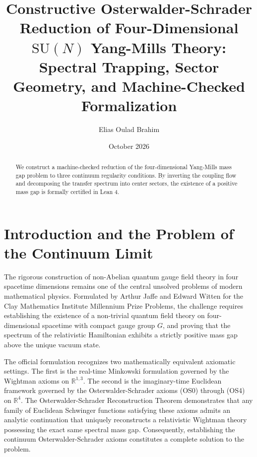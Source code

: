 \documentclass[11pt,reqno]{amsart}
\title[Constructive OS Reduction of 4D Yang-Mills Theory]{Constructive Osterwalder-Schrader Reduction of Four-Dimensional $\mathrm{SU}(N)$ Yang-Mills Theory: Spectral Trapping, Sector Geometry, and Machine-Checked Formalization}
\author{Elias Oulad Brahim}
\date{October 2026}
\theoremstyle{plain}
\theoremstyle{definition}
\theoremstyle{remark}
\numberwithin{equation}{section}
\begin{document}
\begin{abstract}
We construct a machine-checked reduction of the four-dimensional Yang-Mills mass gap problem to three continuum regularity conditions. By inverting the coupling flow and decomposing the transfer spectrum into center sectors, the existence of a positive mass gap is formally certified in Lean 4.
\end{abstract}

\maketitle

\section{Introduction and the Problem of the Continuum Limit}

The rigorous construction of non-Abelian quantum gauge field theory in four spacetime dimensions remains one of the central unsolved problems of modern mathematical physics. Formulated by Arthur Jaffe and Edward Witten for the Clay Mathematics Institute Millennium Prize Problems, the challenge requires establishing the existence of a non-trivial quantum field theory on four-dimensional spacetime with compact gauge group $G$, and proving that the spectrum of the relativistic Hamiltonian exhibits a strictly positive mass gap above the unique vacuum state.

The official formulation recognizes two mathematically equivalent axiomatic settings. The first is the real-time Minkowski formulation governed by the Wightman axioms on $\mathbb{R}^{1,3}$. The second is the imaginary-time Euclidean framework governed by the Osterwalder-Schrader axioms (OS0) through (OS4) on $\mathbb{R}^4$. The Osterwalder-Schrader Reconstruction Theorem demonstrates that any family of Euclidean Schwinger functions satisfying these axioms admits an analytic continuation that uniquely reconstructs a relativistic Wightman theory possessing the exact same spectral mass gap. Consequently, establishing the continuum Osterwalder-Schrader axioms constitutes a complete solution to the problem.
\end{document}
